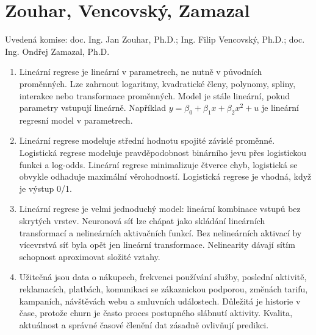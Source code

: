 \documentclass[12pt,a4paper]{article}
\begin{document}
\section{Zouhar, Vencovský, Zamazal}
Uvedená komise: doc. Ing. Jan Zouhar, Ph.D.; Ing. Filip Vencovský, Ph.D.; doc. Ing. Ondřej Zamazal, Ph.D.

\begin{enumerate}
  \item {}

  Lineární regrese je lineární v parametrech, ne nutně v původních proměnných. Lze zahrnout logaritmy,
  kvadratické členy, polynomy, spliny, interakce nebo transformace proměnných. Model je stále lineární,
  pokud parametry vstupují lineárně. Například \(y=\beta_0+\beta_1x+\beta_2x^2+u\) je lineární
  regresní model v parametrech.

  \item {}

  Lineární regrese modeluje střední hodnotu spojité závislé proměnné. Logistická regrese modeluje
  pravděpodobnost binárního jevu přes logistickou funkci a log-odds. Lineární regrese minimalizuje
  čtverce chyb, logistická se obvykle odhaduje maximální věrohodností. Logistická regrese je vhodná,
  když je výstup 0/1.

  \item {}

  Lineární regrese je velmi jednoduchý model: lineární kombinace vstupů bez skrytých vrstev. Neuronová
  síť lze chápat jako skládání lineárních transformací a nelineárních aktivačních funkcí. Bez nelineárních
  aktivací by vícevrstvá síť byla opět jen lineární transformace. Nelinearity dávají sítím schopnost
  aproximovat složité vztahy.

  \item {}

  Užitečná jsou data o nákupech, frekvenci používání služby, poslední aktivitě, reklamacích, platbách,
  komunikaci se zákaznickou podporou, změnách tarifu, kampaních, návštěvách webu a smluvních událostech.
  Důležitá je historie v čase, protože churn je často proces postupného slábnutí aktivity. Kvalita,
  aktuálnost a správné časové členění dat zásadně ovlivňují predikci.
\end{enumerate}
\end{document}

